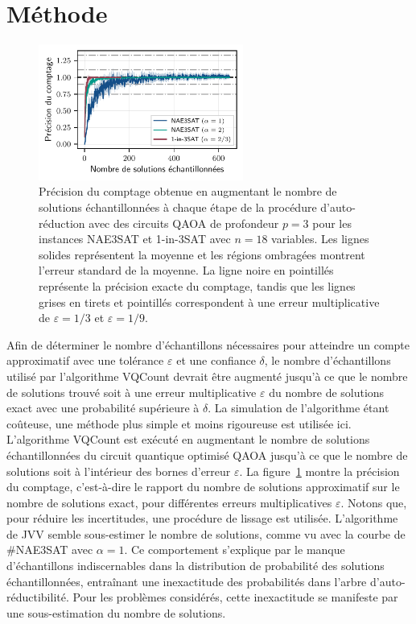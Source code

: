 \section{Méthode}
\label{sec:methode}
\begin{figure}[ht!]
    \centering
    \includegraphics[width=0.6\textwidth]{figures/count-accuracy.pdf}
    \caption[Précision du comptage pour des problèmes \textsf{\#P}-difficile]{Précision du comptage obtenue en augmentant le nombre de solutions échantillonnées à chaque étape de la procédure d'auto-réduction avec des circuits QAOA de profondeur $p=3$ pour les instances NAE3SAT et 1-in-3SAT avec $n=18$ variables. Les lignes solides représentent la moyenne et les régions ombragées montrent l'erreur standard de la moyenne. La ligne noire en pointillés représente la précision exacte du comptage, tandis que les lignes grises en tirets et pointillés correspondent à une erreur multiplicative de $\varepsilon = 1/3$ et $\varepsilon = 1/9$.}
    \label{fig:count-accuracy.pdf}
\end{figure}

Afin de déterminer le nombre d'échantillons nécessaires pour atteindre un compte approximatif avec une tolérance $\varepsilon$ et une confiance $\delta$, le nombre d'échantillons utilisé par l'algorithme VQCount devrait être augmenté jusqu'à ce que le nombre de solutions trouvé soit à une erreur multiplicative $\varepsilon$ du nombre de solutions exact avec une probabilité supérieure à $\delta$. La simulation de l'algorithme étant coûteuse, une méthode plus simple et moins rigoureuse est utilisée ici. L'algorithme VQCount est exécuté en augmentant le nombre de solutions échantillonnées du circuit quantique optimisé QAOA jusqu'à ce que le nombre de solutions soit à l'intérieur des bornes d'erreur $\varepsilon$. La figure~\ref{fig:count-accuracy.pdf} montre la précision du comptage, c'est-à-dire le rapport du nombre de solutions approximatif sur le nombre de solutions exact, pour différentes erreurs multiplicatives $\varepsilon$. Notons que, pour réduire les incertitudes, une procédure de lissage est utilisée. L'algorithme de JVV semble sous-estimer le nombre de solutions, comme vu avec la courbe de \#NAE3SAT avec $\alpha = 1$. Ce comportement s'explique par le manque d'échantillons indiscernables dans la distribution de probabilité des solutions échantillonnées, entraînant une inexactitude des probabilités dans l'arbre d'auto-réductibilité. Pour les problèmes considérés, cette inexactitude se manifeste par une sous-estimation du nombre de solutions.

